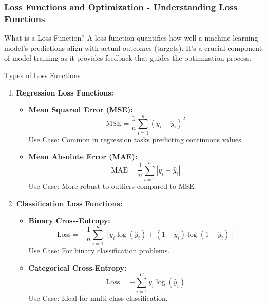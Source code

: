 \documentclass[aspectratio=169]{beamer}
\begin{document}
\begin{frame}[fragile]
    \frametitle{Loss Functions and Optimization - Understanding Loss Functions}
    \begin{block}{What is a Loss Function?}
        A loss function quantifies how well a machine learning model's predictions align with actual outcomes (targets). It's a crucial component of model training as it provides feedback that guides the optimization process.
    \end{block}
    
    \begin{block}{Types of Loss Functions}
        \begin{enumerate}
            \item \textbf{Regression Loss Functions:}
            \begin{itemize}
                \item \textbf{Mean Squared Error (MSE):}
                \begin{equation}
                    \text{MSE} = \frac{1}{n} \sum_{i=1}^{n} (y_i - \hat{y}_i)^2
                \end{equation}
                Use Case: Common in regression tasks predicting continuous values.
                
                \item \textbf{Mean Absolute Error (MAE):}
                \begin{equation}
                    \text{MAE} = \frac{1}{n} \sum_{i=1}^{n} |y_i - \hat{y}_i|
                \end{equation}
                Use Case: More robust to outliers compared to MSE.
            \end{itemize}
            
            \item \textbf{Classification Loss Functions:}
            \begin{itemize}
                \item \textbf{Binary Cross-Entropy:}
                \begin{equation}
                    \text{Loss} = -\frac{1}{n} \sum_{i=1}^{n} [y_i \log(\hat{y}_i) + (1 - y_i) \log(1 - \hat{y}_i)]
                \end{equation}
                Use Case: For binary classification problems.
                
                \item \textbf{Categorical Cross-Entropy:}
                \begin{equation}
                    \text{Loss} = -\sum_{i=1}^{C} y_i \log(\hat{y}_i)
                \end{equation}
                Use Case: Ideal for multi-class classification.
            \end{itemize}
        \end{enumerate}
    \end{block}
\end{frame}
\end{document}
